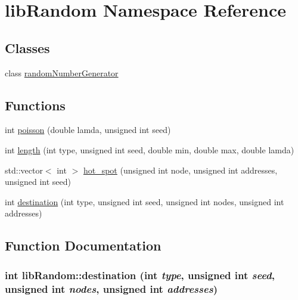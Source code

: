 \hypertarget{namespacelibRandom}{
\section{libRandom Namespace Reference}
\label{namespacelibRandom}
}
\subsection*{Classes}
\begin{CompactItemize}
\item 
class \hyperlink{classlibRandom_1_1randomNumberGenerator}{randomNumberGenerator}
\end{CompactItemize}
\subsection*{Functions}
\begin{CompactItemize}
\item 
int \hyperlink{namespacelibRandom_92b1a45f88ea941a0c13e4d0cf2e2ddf}{poisson} (double lamda, unsigned int seed)
\item 
int \hyperlink{namespacelibRandom_74cde0683301c167495fe532c61019c4}{length} (int type, unsigned int seed, double min, double max, double lamda)
\item 
std::vector$<$ int $>$ \hyperlink{namespacelibRandom_1e1da172d345c4aeb116147d70273bab}{hot\_\-spot} (unsigned int node, unsigned int addresses, unsigned int seed)
\item 
int \hyperlink{namespacelibRandom_e429c63198aca37a932730576103d905}{destination} (int type, unsigned int seed, unsigned int nodes, unsigned int addresses)
\end{CompactItemize}


\subsection{Function Documentation}
\hypertarget{namespacelibRandom_e429c63198aca37a932730576103d905}{
\subsubsection[{destination}]{\setlength{\rightskip}{0pt plus 5cm}int libRandom::destination (int {\em type}, \/  unsigned int {\em seed}, \/  unsigned int {\em nodes}, \/  unsigned int {\em addresses})}}
\label{namespacelibRandom_e429c63198aca37a932730576103d905}


